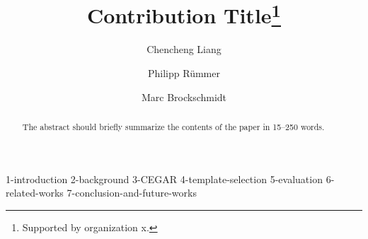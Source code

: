 \documentclass[runningheads]{llncs}
\begin{document}
%
\title{Contribution Title\thanks{Supported by organization x.}}
%
%
\author{Chencheng Liang%
\and
Philipp Rümmer%
\and
Marc Brockschmidt%
}
%
%




%
\maketitle              %
%
\begin{abstract}
The abstract should briefly summarize the contents of the paper in
15--250 words.

\end{abstract}
%
%
%
% 
% 
% 
% 
% 
% 


{1-introduction}
{2-background}
{3-CEGAR}
{4-template-selection}
{5-evaluation}
{6-related-works}
{7-conclusion-and-future-works}




\end{document}
